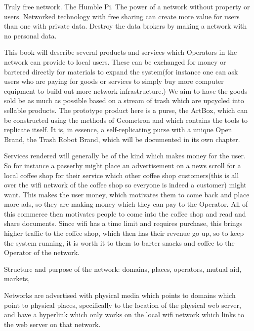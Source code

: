 Truly free network. The Humble Pi.  The power of a network without property or users.  Networked technology with free sharing can create more value for users than one with private data.  Destroy the data brokers by making a network with no personal data.   

This book will describe several products and services which Operators in the network can provide to local users.  These can be exchanged for money or bartered directly for materials to expand the system(for instance one can ask users who are paying for goods or services to simply buy more computer equipment to build out more network infrastructure.)  We aim to have the goods sold be as much as possible based on a stream of trash which are upcycled into sellable products.  The prototype product here is a purse, the ArtBox, which can be constructed using the methods of Geometron and which contains the tools to replicate itself.  It is, in essence, a self-replicating purse with a unique Open Brand, the Trash Robot Brand, which will be documented in its own chapter.  

Services rendered will generally be of the kind which makes money for the user.  So for instance a passerby might place an advertisement on a news scroll for a local coffee shop for their service which other coffee shop customers(this is all over the wifi network of the coffee shop so everyone is indeed a customer) might want.  This makes the user money, which motivates them to come back and place more ads, so they are making money which they can pay to the Operator.  All of this commerce then motivates people to come into the coffee shop and read and share documents.  Since wifi has a time limit and requires purchase, this brings higher traffic to the coffee shop, which then has their revenue go up, so to keep the system running, it is worth it to them to barter snacks and coffee to the Operator of the network.  

Structure and purpose of the network: domains, places, operators, mutual aid, markets, 

Networks are advertised with physical media which points to domains which point to physical places, specifically to the location of the physical web server, and have a hyperlink which only works on the local wifi network which links to the web server on that network.

